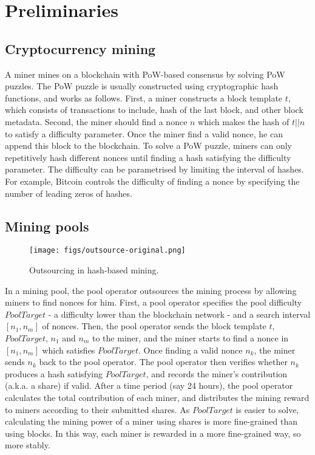 \section{Preliminaries}
\label{sec:preliminaries}

\subsection{Cryptocurrency mining}


A miner mines on a blockchain with PoW-based consensus by solving PoW puzzles.
The PoW puzzle is usually constructed using cryptographic hash functions, and works as follows.
First, a miner constructs a block template $t$, which consists of transactions to include, hash of the last block, and other block metadata.
Second, the miner should find a nonce $n$ which makes the hash of $t || n$ to satisfy a difficulty parameter.
Once the miner find a valid nonce, he can append this block to the blockchain.
To solve a PoW puzzle, miners can only repetitively hash different nonces until finding a hash satisfying the difficulty parameter.
The difficulty can be parametrised by limiting the interval of hashes.
For example, Bitcoin controls the difficulty of finding a nonce by specifying the number of leading zeros of hashes.





\subsection{Mining pools}

\begin{figure}[htp]
    \centering
    \texttt{[image: figs/outsource-original.png]}
    \caption{Outsourcing in hash-based mining.}
    \label{fig:outsource-original}
\end{figure}

In a mining pool, the pool operator outsources the mining process by allowing miners to find nonces for him.
First, a pool operator specifies the pool difficulty $PoolTarget$ - a difficulty lower than the blockchain network - and a search interval $[n_1, n_m]$ of nonces.
Then, the pool operator sends the block template $t$, $PoolTarget$, $n_1$ and $n_m$ to the miner, and the miner starts to find a nonce in $[n_1, n_m]$ which satisfies $PoolTarget$.
Once finding a valid nonce $n_k$, the miner sends $n_k$ back to the pool operator.
The pool operator then verifies whether $n_k$ produces a hash satisfying $PoolTarget$, and records the miner's contribution (a.k.a. a share) if valid.
After a time period (say 24 hours), the pool operator calculates the total contribution of each miner, and distributes the mining reward to miners according to their submitted shares.
As $PoolTarget$ is easier to solve, calculating the mining power of a miner using shares is more fine-grained than using blocks.
In this way, each miner is rewarded in a more fine-grained way, so more stably.


